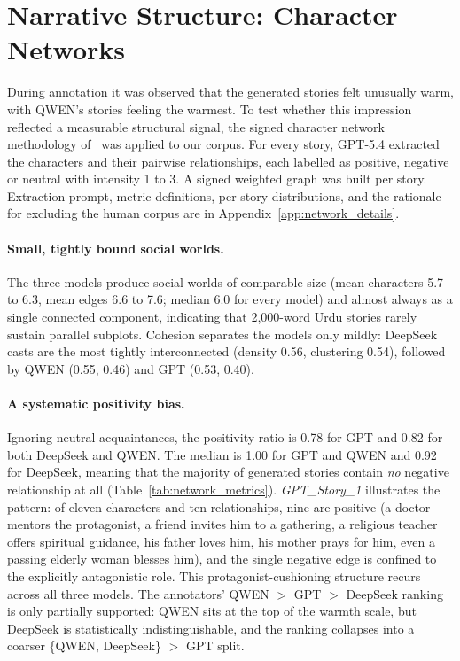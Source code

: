 \documentclass[11pt]{article}
\begin{document}
\section{Narrative Structure: Character Networks}
\label{sec:networks}

During annotation it was observed that the generated
stories felt unusually warm, with QWEN's stories feeling
the warmest. To test whether this impression reflected a
measurable structural signal, the signed character
network methodology of~\citep{networkpaper2025} was
applied to our corpus. For every story, GPT-5.4 extracted
the characters and their pairwise relationships, each
labelled as positive, negative or neutral with intensity
1 to 3. A signed weighted graph was built per story.
Extraction prompt, metric definitions, per-story
distributions, and the rationale for excluding the human
corpus are in Appendix~\ref{app:network_details}.

\paragraph{Small, tightly bound social worlds.}
The three models produce social worlds of comparable size
(mean characters 5.7 to 6.3, mean edges 6.6 to 7.6;
median 6.0 for every model) and almost always as a single
connected component, indicating that 2{,}000-word Urdu
stories rarely sustain parallel subplots. Cohesion
separates the models only mildly: DeepSeek casts are the
most tightly interconnected (density 0.56,
clustering 0.54), followed by QWEN (0.55, 0.46) and GPT
(0.53, 0.40).

\paragraph{A systematic positivity bias.}
Ignoring neutral acquaintances, the positivity ratio is
0.78 for GPT and 0.82 for both DeepSeek and QWEN. The
median is 1.00 for GPT and QWEN and 0.92 for DeepSeek,
meaning that the majority of generated stories contain
\emph{no} negative relationship at all
(Table~\ref{tab:network_metrics}). \textit{GPT\_Story\_1}
illustrates the pattern: of eleven characters and ten
relationships, nine are positive (a doctor mentors the
protagonist, a friend invites him to a gathering, a
religious teacher offers spiritual guidance, his father
loves him, his mother prays for him, even a passing
elderly woman blesses him), and the single negative edge
is confined to the explicitly antagonistic role. This
protagonist-cushioning structure recurs across all three
models. The annotators' QWEN $>$ GPT $>$ DeepSeek
ranking is only partially supported: QWEN sits at the top
of the warmth scale, but DeepSeek is statistically
indistinguishable, and the ranking collapses into a
coarser \{QWEN, DeepSeek\} $>$ GPT split.
\end{document}
